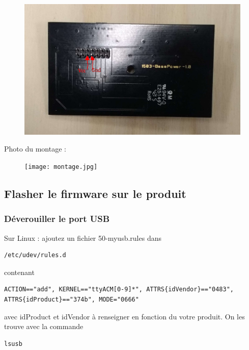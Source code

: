 \documentclass{article}
\begin{document}
\begin{figure}[H]
\begin{center}
\advance\leftskip-3cm
\advance\rightskip-3cm
\includegraphics[keepaspectratio=true,scale=0.6]{power_dos_fleches.png}

\label{visina8}
\end{center}\end{figure}

Photo du montage :

\begin{figure}[H]
\begin{center}
\advance\leftskip-3cm
\advance\rightskip-3cm
\texttt{[image: montage.jpg]}

\label{visina8}
\end{center}\end{figure}

\subsection{Flasher le firmware sur le produit}

\subsubsection{Déverouiller le port USB}
Sur Linux : ajoutez un fichier 50-myusb.rules dans 
\begin{verbatim}
/etc/udev/rules.d

\end{verbatim}
contenant 
\begin{verbatim}
ACTION=="add", KERNEL=="ttyACM[0-9]*", ATTRS{idVendor}=="0483",
ATTRS{idProduct}=="374b", MODE="0666"

\end{verbatim}
avec idProduct et idVendor à renseigner en fonction du votre produit. On les trouve avec la commande 
\begin{verbatim}
lsusb

\end{verbatim}
\end{document}
